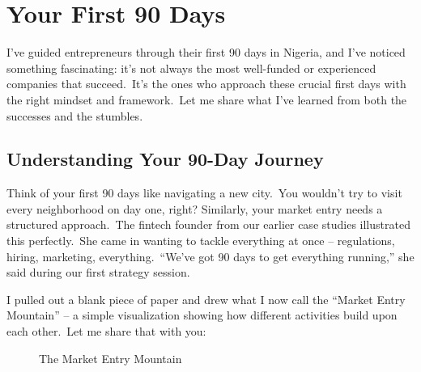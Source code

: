 \chapter{Your First 90 Days}\label{ch:first-90-days}

\begin{importantbox}
I've guided entrepreneurs through their first 90 days in Nigeria, and I've noticed something fascinating: it's not always the most well-funded or experienced companies that succeed.\ It's the ones who approach these crucial first days with the right mindset and framework.\ Let me share what I've learned from both the successes and the stumbles.
\end{importantbox}

\section{Understanding Your 90-Day Journey}\label{sec:understanding-90-day-journey}

Think of your first 90 days like navigating a new city.\ You wouldn't try to visit every neighborhood on day one, right?
Similarly, your market entry needs a structured approach.\ The fintech founder from our earlier case studies illustrated this perfectly.\ She came in wanting to tackle everything at once – regulations, hiring, marketing, everything.\ ``We've got 90 days to get everything running,'' she said during our first strategy session.

I pulled out a blank piece of paper and drew what I now call the ``Market Entry Mountain'' – a simple visualization showing how different activities build upon each other.\ Let me share that with you:

\begin{figure}[htbp]
    \centering
    \caption{The Market Entry Mountain}
    \label{fig:market-entry-mountain}
\end{figure}

